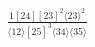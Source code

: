 \documentclass[varwidth, border=5pt]{standalone}
\begin{document}
\begin{my}
$\begin{gathered}
\scriptscriptstyle\frac{1[24][23]^2⟨23⟩^2}{⟨12⟩[25]^3⟨34⟩⟨35⟩}
\end{gathered}$
\end{my}
\end{document}
